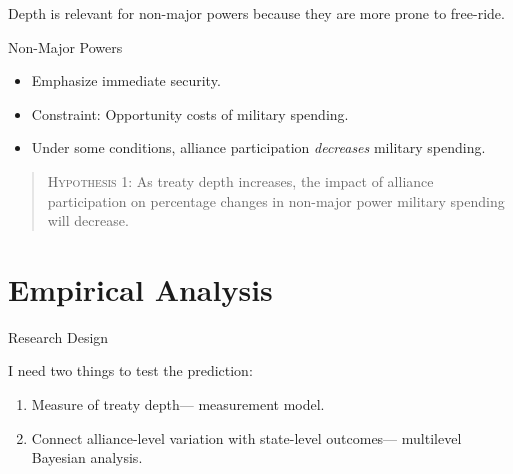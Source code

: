 \documentclass[12pt]{beamer}
\begin{document}

\begin{frame}[standout]

Depth is relevant for non-major powers because they are more prone to free-ride. 

\end{frame}



\begin{frame}{Non-Major Powers}

\begin{itemize}
\item Emphasize immediate security.
\pause
\item Constraint: Opportunity costs of military spending.  
\pause
\item Under some conditions, alliance participation \emph{decreases} military spending. 
\end{itemize} 

\end{frame}


\begin{frame}[standout]

\begin{quote}
\textsc{Hypothesis 1}: As treaty depth increases, the impact of alliance participation on percentage changes in non-major power military spending will decrease.
\end{quote} 


\end{frame}


\section{Empirical Analysis} 


\begin{frame}{Research Design}

I need two things to test the prediction: 

\pause 
\begin{enumerate} 
\item Measure of treaty depth--- measurement model. 
\pause
\item Connect alliance-level variation with state-level outcomes--- multilevel Bayesian analysis.  
\end{enumerate} 


\end{frame}
\end{document}
